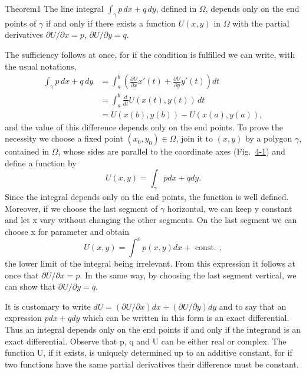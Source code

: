 \begin{originalstatement}{Theorem}{1}\label{thm:4.1}
The line integral $\int_{\gamma} p \, dx + q \, dy$, defined in $\Omega$, depends only on the end points of $\gamma$ if and only if there exists a function $U(x,y)$ in $\Omega$ with the partial derivatives $\partial U / \partial x = p$, $\partial U / \partial y = q$.
\end{originalstatement}
The sufficiency follows at once, for if the condition is fulfilled we can write, with the usual notations,
\begin{equation*}
\begin{aligned}
\int_\gamma p\,dx+q\,dy
&=\int_a^b\left(\frac{\partial U}{\partial x}x'(t)+\frac{\partial U}{\partial y}y'(t)\right)dt\\
&=\int_a^b\frac{d}{dt}U(x(t),y(t))\,dt\\
&=U(x(b),y(b))-U(x(a),y(a)),
\end{aligned}
\end{equation*}
and the value of this difference depends only on the end points. To prove the necessity we choose a fixed point $(x_{0},y_{0})\in\Omega$, join it to $(x,y)$ by a polygon $\gamma$, contained in $\Omega$, whose sides are parallel to the coordinate axes (Fig.~\hyperref[fig:4-1]{4-1}) and define a function by
\begin{equation*}
U (x, y) = \int_ {\gamma} p d x + q d y.
\end{equation*}
Since the integral depends only on the end points, the function is well defined. Moreover, if we choose the last segment of $\gamma$ horizontal, we can keep y constant and let x vary without changing the other segments. On the last segment we can choose x for parameter and obtain
\begin{equation*}
U (x, y) = \int^ {x} p (x, y) d x + \text { const. },
\end{equation*}
the lower limit of the integral being irrelevant. From this expression it
follows at once that $\partial U/\partial x = p$. In the same way, by choosing the last segment vertical, we can show that $\partial U/\partial y = q$.

It is customary to write $dU = (\partial U/\partial x) dx + (\partial U/\partial y) dy$ and to say that an expression $p dx + q dy$ which can be written in this form is an exact differential. Thus an integral depends only on the end points if and only if the integrand is an exact differential. Observe that p, q and U can be either real or complex. The function U, if it exists, is uniquely determined up to an additive constant, for if two functions have the same partial derivatives their difference must be constant.

